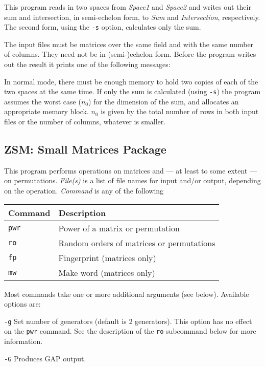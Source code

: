 \Description
This program reads in two spaces from {\em Space1} and {\em Space2}
and writes out their sum and intersection, in semi-echelon form, to
{\em Sum} and {\em Intersection}, respectively. The second form,
using the \verb"-s" option, calculates only the sum.

The input files must be matrices over the same field and with the
same number of columns. They need not be in (semi-)echelon form.
Before the program writes out the result it prints one of the
following messages:


\Limits
In normal mode, there must be enough memory to hold two copies of
each of the two spaces at the same time. If only the sum is
calculated (using \verb"-s") the program assumes the worst case
($n_0$) for the dimension of the sum, and allocates an appropriate
memory block. $n_0$ is given by the total number of rows in both
input files or the number of columns, whatever is smaller.


\subsection{ZSM: Small Matrices Package}
\Syntax
{}

\Description
This program performs operations on matrices and --- at least
to some extent --- on permutations. {\it File(s)} is a list of
file names for input and/or output, depending on the operation.
{\it Command} is any of the following
\begin{center}
\begin{tabular}{|l|l|}
\hline
Command & Description \\
\hline
\tt pwr	& Power of a matrix or permutation \\
\tt ro	& Random orders of matrices or permutations \\
\tt fp	& Fingerprint (matrices only) \\
\tt mw	& Make word (matrices only) \\
\hline
\end{tabular}
\end{center}
Most commands take one or more additional arguments (see below).
Available options are:
\begin{list}{}{ \leftmargin 10mm 
\parsep 0mm\itemsep 0mm}
\item[{\tt -g}]	Set number of generators (default is 2 generators).
    This option has no effect on the {\tt pwr} command. See the
    description of the {\tt ro} subcommand below for more information.
\item[{\tt -G}]	Produces GAP output.
\end{list}


